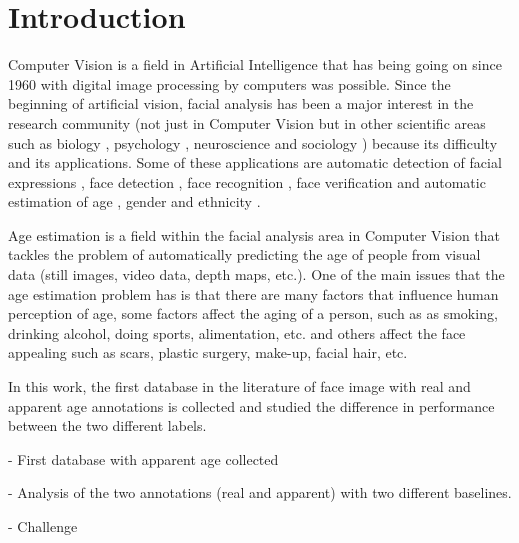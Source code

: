 \chapter{Introduction} \label{chap:introduction}

Computer Vision is a field in Artificial Intelligence that has being going on since 1960 with digital image processing by computers was possible. Since the beginning of artificial vision, facial analysis has been a major interest in the research community (not just in Computer Vision but in other scientific areas such as biology \cite{bhl24064}, psychology \cite{ekm02}, neuroscience \cite{freiwald2009face} and sociology \cite{kemper1978social}) because its difficulty and its applications. Some of these applications are automatic detection of facial expressions \cite{cohen2003facial}, face detection \cite{hsu2002face}, face recognition \cite{wright2009robust}, face verification \cite{taigman2014deepface} and automatic estimation of age \cite{4359348}, gender \cite{alexandre2010gender} and ethnicity \cite{hosoi2004ethnicity}.

Age estimation is a field within the facial analysis area in Computer Vision that tackles the problem of automatically predicting the age of people from visual data (still images, video data, depth maps, etc.). One of the main issues that the age estimation problem has is that there are many factors that influence human perception of age, some factors affect the aging of a person, such as as smoking, drinking alcohol, doing sports, alimentation, etc. and others affect the face appealing such as scars, plastic surgery, make-up, facial hair, etc.

In this work, the first database in the literature of face image with real and apparent age annotations is collected and studied the difference in performance between the two different labels.


- First database with apparent age collected

- Analysis of the two annotations (real and apparent) with two different baselines.

- Challenge


